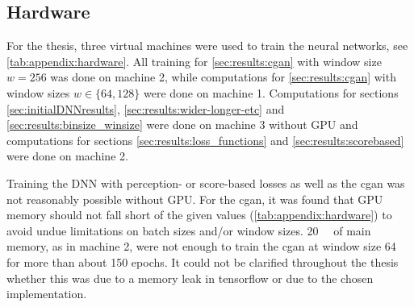 \clearpage
\begin{landscape}
\subsection{Hardware}\label{sec:appendix:hardware}
For the thesis, three virtual machines were used to train the neural networks, see \cref{tab:appendix:hardware}.
All training for \cref{sec:results:cgan} with window size $w=256$ was done on machine 2, 
while computations for  \cref{sec:results:cgan} with window sizes $w \in \{64,128\}$ were done on machine 1.
Computations for sections \ref{sec:initialDNNresults}, \ref{sec:results:wider-longer-etc} and \ref{sec:results:binsize_winsize}
were done on machine 3 without GPU and computations for sections \ref{sec:results:loss_functions} and \ref{sec:results:scorebased} were done on machine 2.

Training the DNN with perception- or score-based losses as well as the \acrshort{cgan} was not reasonably possible without GPU.
For the \acrshort{cgan}, it was found that GPU memory should not fall short of the given values (\cref{tab:appendix:hardware})
to avoid undue limitations on batch sizes and/or window sizes.
\SI{20}{\giga\byte} of main memory, as in machine 2, were not enough to train the \acrshort{cgan} at window size 64 for more than about 150 epochs.
It could not be clarified throughout the thesis whether this was due to a memory leak in tensorflow or due to the chosen implementation.


\end{landscape}
